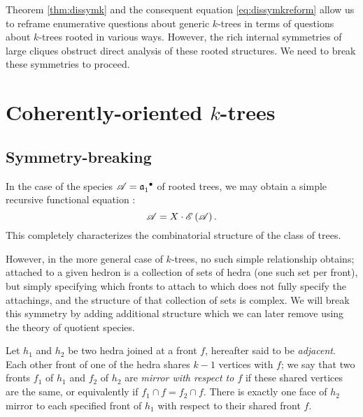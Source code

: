 \documentclass[distribution,draft]{brandiss} %
\numberwithin{section}{chapter}
\numberwithin{figure}{chapter}
\begin{document}
Theorem \ref{thm:dissymk} and the consequent equation \eqref{eq:dissymkreform} allow us to reframe enumerative questions about generic $k$-trees in terms of questions about $k$-trees rooted in various ways.
However, the rich internal symmetries of large cliques obstruct direct analysis of these rooted structures.
We need to break these symmetries to proceed.

\section{Coherently-oriented $k$-trees}
\subsection{Symmetry-breaking}\label{ss:symbreak}
In the case of the species $\mathscr{A} =  {\mathfrak{a}_{1}^{}}^{\bullet } $ of rooted trees, we may obtain a simple recursive functional equation \cite[\S 1, eq.~(9)]{bll:species}:
\begin{equation}
  \label{eq:rtrees}
  \mathscr{A} = X \cdot \mathscr{E} \left( {\mathscr{A}} \right).
\end{equation}
This completely characterizes the combinatorial structure of the class of trees.

However, in the more general case of $k$-trees, no such simple relationship obtains; attached to a given hedron is a collection of sets of hedra (one such set per front), but simply specifying which fronts to attach to which does not fully specify the attachings, and the structure of that collection of sets is complex.
We will break this symmetry by adding additional structure which we can later remove using the theory of quotient species.

\begin{definition}
  \label{def:mirrorfronts}
  Let $h_{1}$ and $h_{2}$ be two hedra joined at a front $f$, hereafter said to be \emph{adjacent}.
  Each other front of one of the hedra shares $k-1$ vertices with $f$; we say that two fronts $f_{1}$ of $h_{1}$ and $f_{2}$ of $h_{2}$ are \emph{mirror with respect to $f$} if these shared vertices are the same, or equivalently if $f_{1} \cap f = f_{2} \cap f$.
  There is exactly one face of $h_{2}$ mirror to each specified front of $h_{1}$ with respect to their shared front $f$.
\end{definition}

\begin{comment} Don't think we need this after all...
  \begin{definition}\label{def:cycord}
    For a set $A$, define a \emph{cyclic order of $A$} to be a labeling of the cyclic digraph $\overrightarrow{C}_{\abs{A}}$ by $A$ and let $\cyc A$ be the set of such linear orders. Let $\lin A$ be the set of linear orders on $A$. Let $\psi_{A}: \lin A \to \cyc A$ (hereafter denoted simply $\psi$ when the set is unambiguous) send each linear order $\ell$ to the cyclic order obtained by decorating $\overrightarrow{C}_{\abs{A}}$ with $\ell$ in order. (Note that this map is $\abs{A}$-to-one.) Then a \emph{linearization} of a given cyclic order $c \in \cyc A$ is an element of $\psi^{-1} \pbrac{c}$.
  \end{definition}
\end{comment}
\end{document}
